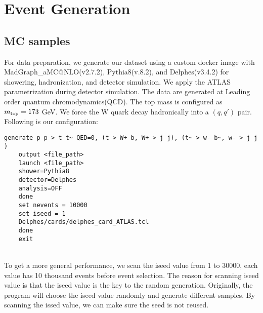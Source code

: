 \chapter{Event Generation}\label{Event Generation}



\section{MC samples}\label{sec:MC sample}
For data preparation, we generate our dataset using a custom docker image with MadGraph\_aMC@NLO(v2.7.2), Pythia8(v.8.2), and Delphes(v3.4.2) for showering, hadronization, and detector simulation. We apply the ATLAS parametrization during detector simulation.  The data are generated at Leading order quantum chromodynamics(QCD). The top mass is configured as $m_{\rm top}=173$ GeV. We force the W quark decay hadronically into a $(q, q')$ pair. Following is our configuration:
\\
\begin{adjustbox}{max width=\textwidth}
\centering
\begin{lstlisting}[caption={Configuration for generating samples. The ``iseed'' is just a placeholder, it will be changed while generating samples.},captionpos=b]
	generate p p > t t~ QED=0, (t > W+ b, W+ > j j), (t~ > w- b~, w- > j j ) 
	output <file_path> 
	launch <file_path> 
	shower=Pythia8  
	detector=Delphes 
	analysis=OFF 
	done  
	set nevents = 10000 
	set iseed = 1 
	Delphes/cards/delphes_card_ATLAS.tcl
	done 
	exit 
\end{lstlisting}
\end{adjustbox}
\\
To get a more general performance, we scan the iseed value from 1 to 30000, each value has 10 thousand events before event selection. The reason for scanning iseed value is that the iseed value is the key to the random generation. Originally, the program will choose the iseed value randomly and generate different samples. By scanning the issed value, we can make sure the seed is not reused. 





